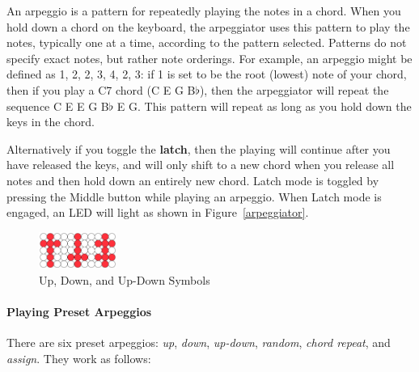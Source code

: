 \documentclass{article}
\begin{document}
An arpeggio is a pattern for repeatedly playing the notes in a chord.  When you hold down a chord on the keyboard, the arpeggiator uses this pattern to play the notes, typically one at a time, according to the pattern selected.  Patterns do not specify exact notes, but rather note orderings.  For example, an arpeggio might be defined as 1, 2, 2, 3, 4, 2, 3: if 1 is set to be the root (lowest) note of your chord, then if you play a C7 chord (C E G B$\flat$), then the arpeggiator will repeat the sequence C E E G B$\flat$ E G.  This pattern will repeat as long as you hold down the keys in the chord.  

Alternatively if you toggle the {\bf latch}, then the playing will continue after you have released the keys, and will only shift to a new chord when you release all notes and then hold down an entirely new chord.  Latch mode is toggled by pressing the Middle button while playing an arpeggio.  When Latch mode is engaged, an LED will light as shown in Figure~\ref{arpeggiator}.

\begin{figure}
\begin{center}
\vspace{-4em}\includegraphics[width=1in]{updown}
\vspace{-1em}
\caption{\small Up, Down, and Up-Down Symbols}
\vspace{-3em}
\end{center}
\end{figure}


\paragraph{Playing Preset Arpeggios}

There are six preset arpeggios: {\it up}, {\it down}, {\it up-down}, {\it random}, {\it chord repeat}, and {\it assign}.  They work as follows:
\end{document}
